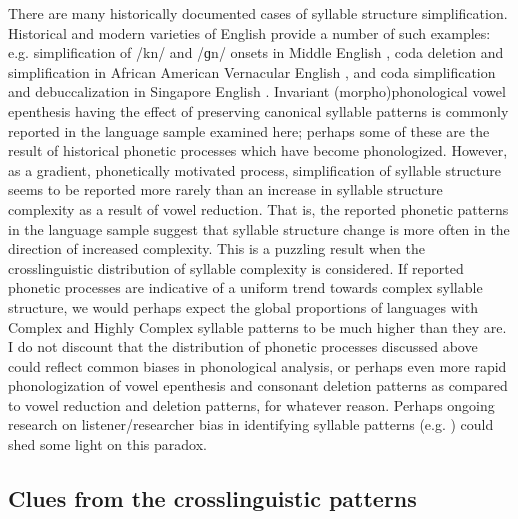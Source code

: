   There are many historically documented cases of syllable structure simplification. Historical and modern varieties of English provide a number of such examples: e.g. simplification of /kn/ and /ɡn/ onsets in Middle English \citep{Minkova2003}, coda deletion and simplification in African American Vernacular English \citep{Rickford1999}, and coda simplification and debuccalization in Singapore English \citep{Deterding2007}. Invariant (morpho)phonological vowel epenthesis having the effect of preserving canonical syllable patterns is commonly reported in the language sample examined here; perhaps some of these are the result of historical phonetic processes which have become phonologized. However, as a gradient, phonetically motivated process, simplification of syllable structure seems to be reported more rarely than an increase in syllable structure complexity as a result of vowel reduction. That is, the reported phonetic patterns in the language sample suggest that syllable structure change is more often in the direction of increased complexity. This is a puzzling result when the crosslinguistic distribution of syllable complexity is considered. If reported phonetic processes are indicative of a uniform trend towards complex syllable structure, we would perhaps expect the global proportions of languages with Complex and Highly Complex syllable patterns to be much higher than they are. I do not discount that the distribution of phonetic processes discussed above could reflect common biases in phonological analysis, or perhaps even more rapid phonologization of vowel epenthesis and consonant deletion patterns as compared to vowel reduction and deletion patterns, for whatever reason. Perhaps ongoing research on listener/researcher bias in identifying syllable patterns (e.g. \citealt{KwonEtAl2017}) could shed some light on this paradox.

\subsection{Clues from the crosslinguistic patterns}\label{sec:8.4.2}

